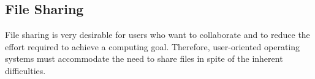 \subsection{File Sharing}\label{subsec:File_Sharing}
File sharing is very desirable for users who want to collaborate and to reduce the effort required to achieve a computing goal.
Therefore, user-oriented operating systems must accommodate the need to share files in spite of the inherent difficulties.


